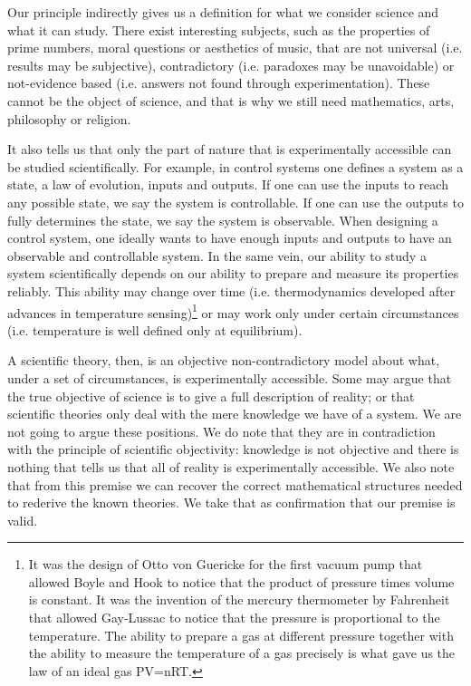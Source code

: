 \documentclass[twocolumn]{article}
\begin{document}
Our principle indirectly gives us a definition for what we consider science and what it can study. There exist interesting subjects, such as the properties of prime numbers, moral questions or aesthetics of music, that are not universal (i.e. results may be subjective), contradictory (i.e. paradoxes may be unavoidable) or not-evidence based (i.e. answers not found through experimentation). These cannot be the object of science, and that is why we still need mathematics, arts, philosophy or religion.

It also tells us that only the part of nature that is experimentally accessible can be studied scientifically. For example, in control systems one defines a system as a state, a law of evolution, inputs and outputs. If one can use the inputs to reach any possible state, we say the system is controllable. If one can use the outputs to fully determines the state, we say the system is observable. When designing a control system, one ideally wants to have enough inputs and outputs to have an observable and controllable system. In the same vein, our ability to study a system scientifically depends on our ability to prepare and measure its properties reliably. This ability may change over time (i.e. thermodynamics developed after advances in temperature sensing)\footnote{It was the design of Otto von Guericke for the first vacuum pump that allowed Boyle and Hook to notice that the product of pressure times volume is constant. It was the invention of the mercury thermometer by Fahrenheit that allowed Gay-Lussac to notice that the pressure is proportional to the temperature. The ability to prepare a gas at different pressure together with the ability to measure the temperature of a gas precisely is what gave us the law of an ideal gas PV=nRT.} or may work only under certain circumstances (i.e. temperature is well defined only at equilibrium).

A scientific theory, then, is an objective non-contradictory model about what, under a set of circumstances, is experimentally accessible. Some may argue that the true objective of science is to give a full description of reality; or that scientific theories only deal with the mere knowledge we have of a system. We are not going to argue these positions. We do note that they are in contradiction with the principle of scientific objectivity: knowledge is not objective and there is nothing that tells us that all of reality is experimentally accessible. We also note that from this premise we can recover the correct mathematical structures needed to rederive the known theories. We take that as confirmation that our premise is valid.
\end{document}
